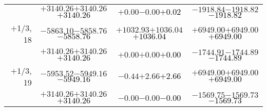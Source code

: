 \documentclass[compress]{beamer}
\begin{document}
\begin{frame}
{\begin{tabular}{r | c | c | c}
           & $+3140.26$\hspace{0.1 cm}$+3140.26$\hspace{0.1 cm}\textcolor{black}{$+3140.26$} & $+0.00$\hspace{0.1 cm}$-0.00$\hspace{0.1 cm}\textcolor{black}{$+0.02$} & $-1918.84$\hspace{0.1 cm}$-1918.82$\hspace{0.1 cm}\textcolor{black}{$-1918.82$} \\
$+$1/3, 18 & $-5863.10$\hspace{0.1 cm}$-5858.76$\hspace{0.1 cm}\textcolor{black}{$-5858.76$} & $+1032.93$\hspace{0.1 cm}$+1036.04$\hspace{0.1 cm}\textcolor{black}{$+1036.04$} & $+6949.00$\hspace{0.1 cm}$+6949.00$\hspace{0.1 cm}\textcolor{black}{$+6949.00$} \\
           & $+3140.26$\hspace{0.1 cm}$+3140.26$\hspace{0.1 cm}\textcolor{black}{$+3140.26$} & $+0.00$\hspace{0.1 cm}$+0.00$\hspace{0.1 cm}\textcolor{black}{$+0.00$} & $-1744.91$\hspace{0.1 cm}$-1744.89$\hspace{0.1 cm}\textcolor{black}{$-1744.89$} \\
$+$1/3, 19 & $-5953.52$\hspace{0.1 cm}$-5949.16$\hspace{0.1 cm}\textcolor{black}{$-5949.16$} & $-0.44$\hspace{0.1 cm}$+2.66$\hspace{0.1 cm}\textcolor{black}{$+2.66$} & $+6949.00$\hspace{0.1 cm}$+6949.00$\hspace{0.1 cm}\textcolor{black}{$+6949.00$} \\
           & $+3140.26$\hspace{0.1 cm}$+3140.26$\hspace{0.1 cm}\textcolor{black}{$+3140.26$} & $-0.00$\hspace{0.1 cm}$-0.00$\hspace{0.1 cm}\textcolor{black}{$-0.00$} & $-1569.75$\hspace{0.1 cm}$-1569.73$\hspace{0.1 cm}\textcolor{black}{$-1569.73$} \\

\end{tabular}}
\end{frame}
\end{document}
